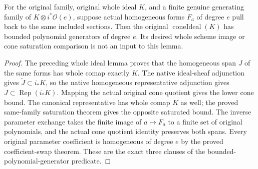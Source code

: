 \begin{lemma}
\label{lem:c0n-cone-generators-actual-cone-bounds}
\leanok
For the original family, original whole ideal $K$, and a finite genuine
generating family of $K\otimes i^*\mathcal O(e)$, suppose actual homogeneous
forms $F_a$ of degree $e$ pull back to the same included sections.
Then the original $\operatorname{coneIdeal}(K)$ has bounded polynomial
generators of degree $e$.  Its desired whole scheme image or cone
saturation comparison is not an input to this lemma.
\end{lemma}
\begin{proof}
The preceding whole ideal lemma proves that the homogeneous span $J$ of
the same forms has whole comap exactly $K$.  The native ideal-sheaf
adjunction gives $\widetilde J\subset i_*K$, so the native homogeneous
representative adjunction gives $J\subset\operatorname{Rep}(i_*K)$.
Mapping the actual original cone quotient gives the lower cone bound.
The canonical representative has whole comap $K$ as well; the proved
same-family saturation theorem gives the opposite saturated bound.
The inverse parameter exchange takes the finite image of $a\mapsto F_a$
to a finite set of original polynomials, and the actual cone quotient
identity preserves both spans.  Every original parameter coefficient is
homogeneous of degree $e$ by the proved coefficient-swap theorem.  These
are the exact three clauses of the bounded-polynomial-generator predicate.
\end{proof}

